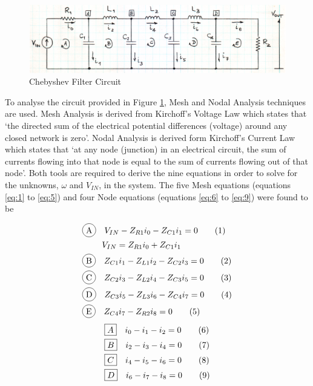 \documentclass[11pt,a4paper]{article}
\newcommand*\tageq{\refstepcounter{equation}\tag{\theequation}}
\newcommand*\circled[1]{\tikz[baseline=(char.base)]{
            \node[shape=circle,draw,inner sep=2pt] (char) {#1};}}
\begin{document}
\medskip	
\begin{figure}[h]
	\centering
	\includegraphics[width=0.9\linewidth]{Images/Circuit.png}
	\caption{Chebyshev Filter Circuit}
	\label{fig:circuit}
\end{figure}

To analyse the circuit provided in Figure \ref{fig:circuit}, Mesh and Nodal Analysis techniques are used. Mesh Analysis is derived from Kirchoff's Voltage Law which states that `the directed sum of the electrical potential differences (voltage) around any closed network is zero'. Nodal Analysis is derived form Kirchoff's Current Law which states that `at any node (junction) in an electrical circuit, the sum of currents flowing into that node is equal to the sum of currents flowing out of that node'. Both tools are required to derive the nine equations in order to solve for the unknowns, $\omega$ and $V_{IN}$, in the system. The five Mesh equations (equations \ref{eq:1} to \ref{eq:5}) and four Node equations (equations \ref{eq:6} to \ref{eq:9}) were found to be

\begin{align}
	&\circled{A} \quad V_{IN} - Z_{R1}i_{0} - Z_{C1}i_{1} = 0 \tageq\label{eq:1}\\
	&\quad \quad \, \, V_{IN} = Z_{R1}i_{0} + Z_{C1}i_{1} \notag \\
	&\circled{B} \quad Z_{C1}i_{1} - Z_{L1}i_{2} - Z_{C2}i_{3} = 0 \tageq\label{eq:2}\\
	&\circled{C} \quad Z_{C2}i_{3} - Z_{L2}i_{4} - Z_{C3}i_{5} = 0 \tageq\label{eq:3}\\
	&\circled{D} \quad Z_{C3}i_{5} - Z_{L3}i_{6} - Z_{C4}i_{7} = 0 \tageq\label{eq:4}\\
	&\circled{E} \quad Z_{C4}i_{7} - Z_{R2}i_{8} = 0 \tageq\label{eq:5}
\end{align}
\begin{align}
	&\boxed{A} \quad i_{0} - i_{1} - i_{2} = 0 \tageq\label{eq:6}\\
	&\boxed{B} \quad i_{2} - i_{3} - i_{4} = 0 \tageq\label{eq:7}\\
	&\boxed{C} \quad i_{4} - i_{5} - i_{6} = 0 \tageq\label{eq:8}\\
	&\boxed{D} \quad i_{6} - i_{7} - i_{8} = 0 \tageq\label{eq:9}
\end{align}
\end{document}
